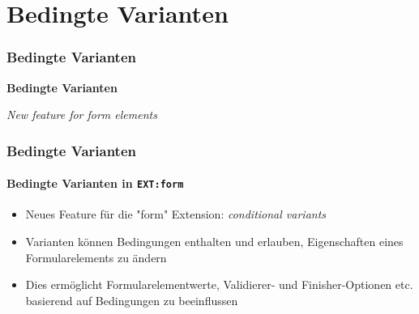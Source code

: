 %

\section{Bedingte Varianten}
\begin{frame}[fragile]
	\frametitle{Bedingte Varianten}

	\begin{center}\huge{\color{typo3darkgrey}\textbf{Bedingte Varianten}}\end{center}
	\begin{center}\large{\textit{New feature for form elements}}\end{center}

\end{frame}


\begin{frame}[fragile]
	\frametitle{Bedingte Varianten}
	\framesubtitle{Bedingte Varianten in \texttt{EXT:form}}

	\begin{itemize}
		\item Neues Feature für die "form" Extension: \textit{conditional variants}
		\item Varianten können Bedingungen enthalten und erlauben, Eigenschaften eines
			Formularelements zu ändern
		\item Dies ermöglicht Formularelementwerte, Validierer- und Finisher-Optionen etc. 
			basierend auf Bedingungen zu beeinflussen

	\end{itemize}

\end{frame}


